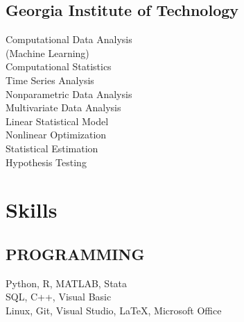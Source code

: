 \documentclass[]{hieudo-build}
\begin{document}
\begin{minipage}[t]{0.34\textwidth}
\subsection{Georgia Institute of Technology}
Computational Data Analysis \\
(Machine Learning) \\
Computational Statistics \\
Time Series Analysis \\
Nonparametric Data Analysis \\
Multivariate Data Analysis \\
Linear Statistical Model \\
Nonlinear Optimization \\
Statistical Estimation \\
Hypothesis Testing 

\section{Skills}
\subsection{PROGRAMMING}
Python, R, MATLAB, Stata \\ 
SQL, C++, Visual Basic \\
Linux, Git, Visual Studio, \LaTeX, Microsoft Office \\
\sectionsep





\end{minipage}
\end{document}

